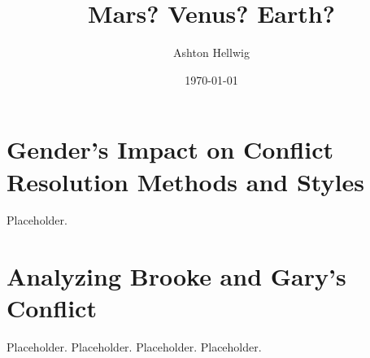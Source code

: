\documentclass[stu,12pt]{apa7}
\title{%
    Mars? Venus? Earth?
  }
\author{Ashton Hellwig}
\date{\today}
\begin{document}
  \maketitle


  \section{Gender's Impact on Conflict Resolution Methods and Styles}
    Placeholder.

  \section{Analyzing Brooke and Gary's Conflict}
    Placeholder.
    Placeholder.
    Placeholder.
    Placeholder.



  \newpage
  \nocite{*}
  \printbibliography[%
    title={Works Consulted},%
    heading={bibintoc},%
    category={consulted}%
  ]
\end{document}
